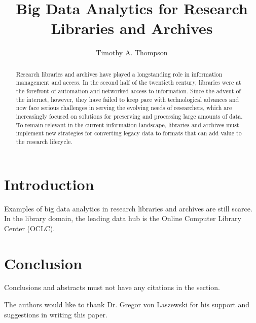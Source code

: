 \documentclass[sigconf]{acmart}
\begin{document}
\title{Big Data Analytics for Research Libraries and Archives}

\author{Timothy A. Thompson}

\begin{abstract}
Research libraries and archives have played a longstanding role in information management and access. In the second half of the twentieth century, libraries were at the forefront of automation and networked access to information. Since the advent of the internet, however, they have failed to keep pace with technological advances and now face serious challenges in serving the evolving needs of researchers, which are increasingly focused on solutions for preserving and processing large amounts of data. To remain relevant in the current information landscape, libraries and archives must implement new strategies for converting legacy data to formats that can add value to the research lifecycle.
\end{abstract}


\maketitle

\section{Introduction}

Examples of big data analytics in research libraries and archives are still scarce. In the library domain, the leading data hub is the Online Computer Library Center (OCLC)\cite{mT13}.

\section{Conclusion}

Conclusions and abstracts must not have any citations in the section.


\begin{acks}

The authors would like to thank Dr. Gregor von Laszewski for his support and suggestions in writing this paper.

\end{acks}


 
\end{document}
